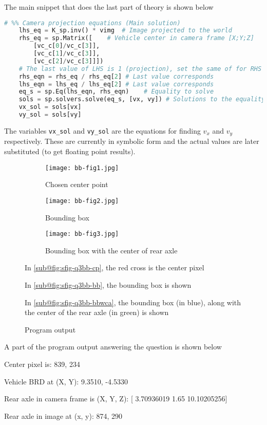 The main snippet that does the last part of theory is shown below

\begin{lstlisting}[language=Python]
    # %% Camera projection equations (Main solution)
    lhs_eq = K_sp.inv() * vimg  # Image projected to the world
    rhs_eq = sp.Matrix([    # Vehicle center in camera frame [X;Y;Z]
        [vc_c[0]/vc_c[3]],
        [vc_c[1]/vc_c[3]],
        [vc_c[2]/vc_c[3]]])
    # The last value of LHS is 1 (projection), set the same of for RHS
    rhs_eqn = rhs_eq / rhs_eq[2] # Last value corresponds
    lhs_eqn = lhs_eq / lhs_eq[2] # Last value corresponds
    eq_s = sp.Eq(lhs_eqn, rhs_eqn)    # Equality to solve
    sols = sp.solvers.solve(eq_s, [vx, vy]) # Solutions to the equality
    vx_sol = sols[vx]
    vy_sol = sols[vy]
\end{lstlisting}

The variables \texttt{vx\_sol} and \texttt{vy\_sol} are the equations for finding $v_x$ and $v_y$ respectively. These are currently in symbolic form and the actual values are later substituted (to get floating point results).

\begin{figure}[H]
    \centering
    \begin{subfigure}[b]{\textwidth}
        \centering
        \texttt{[image: bb-fig1.jpg]}
        \caption{Chosen center point}
        \label{fig:sfig-q3bb-cp}
    \end{subfigure}
    \begin{subfigure}[b]{\textwidth}
        \centering
        \texttt{[image: bb-fig2.jpg]}
        \caption{Bounding box}
        \label{fig:sfig-q3bb-bb}
    \end{subfigure}
    \begin{subfigure}[b]{\textwidth}
        \centering
        \texttt{[image: bb-fig3.jpg]}
        \caption{Bounding box with the center of rear axle}
        \label{fig:sfig-q3bb-bbwca}
    \end{subfigure}
    \caption{Program output}
    \label{fig:q3-bb-output}
    \small
        In \ref{sub@fig:sfig-q3bb-cp}, the red cross is the center pixel

        In \ref{sub@fig:sfig-q3bb-bb}, the bounding box is shown

        In \ref{sub@fig:sfig-q3bb-bbwca}, the bounding box (in blue), along with the center of the rear axle (in green) is shown
\end{figure}

A part of the program output answering the question is shown below

\begin{displayquote}
    Center pixel is: 839, 234

    Vehicle BRD at (X, Y): 9.3510, -4.5330

    Rear axle in camera frame is (X, Y, Z): [ 3.70936019  1.65       10.10205256]

    Rear axle in image at (x, y): 874, 290    
\end{displayquote}
